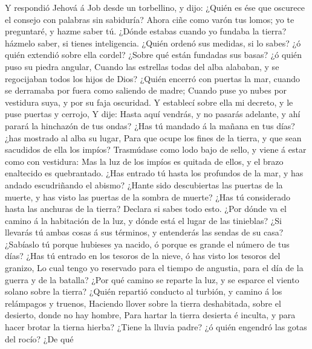  Y respondió Jehová á Job desde un torbellino, y dijo:
 ¿Quién es ése que oscurece el consejo con palabras sin
sabiduría?  Ahora ciñe como varón tus lomos; yo te
preguntaré, y hazme saber tú.  ¿Dónde estabas cuando yo
fundaba la tierra? házmelo saber, si tienes inteligencia. 
¿Quién ordenó sus medidas, si lo sabes? ¿ó quién extendió sobre ella
cordel?  ¿Sobre qué están fundadas sus basas? ¿ó quién
puso su piedra angular,  Cuando las estrellas todas del
alba alababan, y se regocijaban todos los hijos de Dios? 
¿Quién encerró con puertas la mar, cuando se derramaba por fuera como
saliendo de madre;  Cuando puse yo nubes por vestidura
suya, y por su faja oscuridad.  Y establecí sobre ella mi
decreto, y le puse puertas y cerrojo,  Y dije: Hasta aquí
vendrás, y no pasarás adelante, y ahí parará la hinchazón de tus ondas?
 ¿Has tú mandado á la mañana en tus días? ¿has mostrado
al alba su lugar,  Para que ocupe los fines de la tierra,
y que sean sacudidos de ella los impíos?  Trasmúdase como
lodo bajo de sello, y viene á estar como con vestidura: 
Mas la luz de los impíos es quitada de ellos, y el brazo enaltecido es
quebrantado.  ¿Has entrado tú hasta los profundos de la
mar, y has andado escudriñando el abismo?  ¿Hante sido
descubiertas las puertas de la muerte, y has visto las puertas de la
sombra de muerte?  ¿Has tú considerado hasta las anchuras
de la tierra? Declara si sabes todo esto.  ¿Por dónde va
el camino á la habitación de la luz, y dónde está el lugar de las
tinieblas?  ¿Si llevarás tú ambas cosas á sus términos, y
entenderás las sendas de su casa?  ¿Sabíaslo tú porque
hubieses ya nacido, ó porque es grande el número de tus días?
 ¿Has tú entrado en los tesoros de la nieve, ó has visto
los tesoros del granizo,  Lo cual tengo yo reservado para
el tiempo de angustia, para el día de la guerra y de la batalla?
 ¿Por qué camino se reparte la luz, y se esparce el
viento solano sobre la tierra?  ¿Quién repartió conducto
al turbión, y camino á los relámpagos y truenos, 
Haciendo llover sobre la tierra deshabitada, sobre el desierto, donde no
hay hombre,  Para hartar la tierra desierta é inculta, y
para hacer brotar la tierna hierba?  ¿Tiene la lluvia
padre? ¿ó quién engendró las gotas del rocío?  ¿De qué

